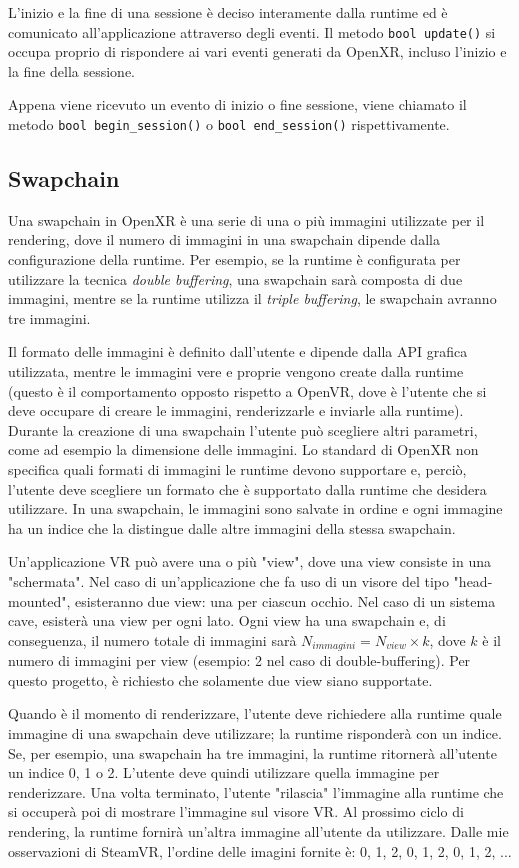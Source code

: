 \documentclass[twoside]{supsistudent}
\begin{document}
L'inizio e la fine di una sessione è deciso interamente dalla runtime ed è comunicato all'applicazione attraverso degli eventi. Il metodo \texttt{bool update()} si occupa proprio di rispondere ai vari eventi generati da OpenXR, incluso l'inizio e la fine della sessione.

Appena viene ricevuto un evento di inizio o fine sessione, viene chiamato il metodo \texttt{bool begin\_session()} o \texttt{bool end\_session()} rispettivamente.

\subsection{Swapchain}

Una swapchain in OpenXR è una serie di una o più immagini utilizzate per il rendering, dove il numero di immagini in una swapchain dipende dalla configurazione della runtime. Per esempio, se la runtime è configurata per utilizzare la tecnica \textit{double buffering}, una swapchain sarà composta di due immagini, mentre se la runtime utilizza il \textit{triple buffering}, le swapchain avranno tre immagini.

Il formato delle immagini è definito dall'utente e dipende dalla API grafica utilizzata, mentre le immagini vere e proprie vengono create dalla runtime (questo è il comportamento opposto rispetto a OpenVR, dove è l'utente che si deve occupare di creare le immagini, renderizzarle e inviarle alla runtime). Durante la creazione di una swapchain l'utente può scegliere altri parametri, come ad esempio la dimensione delle immagini. Lo standard di OpenXR non specifica quali formati di immagini le runtime devono supportare e, perciò, l'utente deve scegliere un formato che è supportato dalla runtime che desidera utilizzare. In una swapchain, le immagini sono salvate in ordine e ogni immagine ha un indice che la distingue dalle altre immagini della stessa swapchain.

Un'applicazione VR può avere una o più "view", dove una view consiste in una "schermata". Nel caso di un'applicazione che fa uso di un visore del tipo "head-mounted", esisteranno due view: una per ciascun occhio. Nel caso di un sistema cave, esisterà una view per ogni lato. Ogni view ha una swapchain e, di conseguenza, il numero totale di immagini sarà $ {N}_{immagini} = {N}_{view} \times k $, dove $ k $ è il numero di immagini per view (esempio: 2 nel caso di double-buffering). Per questo progetto, è richiesto che solamente due view siano supportate.

Quando è il momento di renderizzare, l'utente deve richiedere alla runtime quale immagine di una swapchain deve utilizzare; la runtime risponderà con un indice. Se, per esempio, una swapchain ha tre immagini, la runtime ritornerà all'utente un indice 0, 1 o 2. L'utente deve quindi utilizzare quella immagine per renderizzare. Una volta terminato, l'utente "rilascia" l'immagine alla runtime che si occuperà poi di mostrare l'immagine sul visore VR. Al prossimo ciclo di rendering, la runtime fornirà un'altra immagine all'utente da utilizzare. Dalle mie osservazioni di SteamVR, l'ordine delle imagini fornite è: 0, 1, 2, 0, 1, 2, 0, 1, 2, ...
\end{document}
